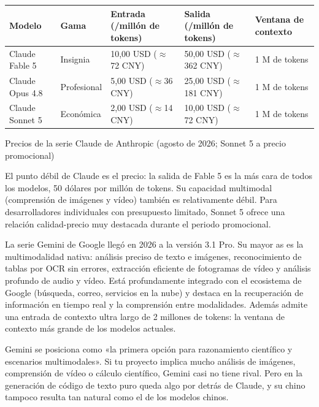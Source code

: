 \begin{center}
\begin{tabularx}{\linewidth}{|X|X|X|X|X|}
\hline
\textbf{Modelo} & \textbf{Gama} & \textbf{Entrada (/millón de tokens)} & \textbf{Salida (/millón de tokens)} & \textbf{Ventana de contexto} \tabularnewline
\hline
Claude Fable 5 & Insignia & 10,00 USD ($\approx$72 CNY) & 50,00 USD ($\approx$362 CNY) & 1 M de tokens \tabularnewline
Claude Opus 4.8 & Profesional & 5,00 USD ($\approx$36 CNY) & 25,00 USD ($\approx$181 CNY) & 1 M de tokens \tabularnewline
Claude Sonnet 5 & Económica & 2,00 USD ($\approx$14 CNY) & 10,00 USD ($\approx$72 CNY) & 1 M de tokens \tabularnewline
\hline
\end{tabularx}
\end{center}

\begin{center}\small\color{gray}Precios de la serie Claude de Anthropic (agosto de 2026; Sonnet 5 a precio promocional)\end{center}

El punto débil de Claude es el precio: la salida de Fable 5 es la más cara de todos los modelos, 50 dólares por millón de tokens. Su capacidad multimodal (comprensión de imágenes y vídeo) también es relativamente débil. Para desarrolladores individuales con presupuesto limitado, Sonnet 5 ofrece una relación calidad-precio muy destacada durante el periodo promocional.


La serie Gemini de Google llegó en 2026 a la versión 3.1 Pro. Su mayor as es la multimodalidad nativa: análisis preciso de texto e imágenes, reconocimiento de tablas por OCR sin errores, extracción eficiente de fotogramas de vídeo y análisis profundo de audio y vídeo. Está profundamente integrado con el ecosistema de Google (búsqueda, correo, servicios en la nube) y destaca en la recuperación de información en tiempo real y la comprensión entre modalidades. Además admite una entrada de contexto ultra largo de 2 millones de tokens: la ventana de contexto más grande de los modelos actuales.

Gemini se posiciona como «la primera opción para razonamiento científico y escenarios multimodales». Si tu proyecto implica mucho análisis de imágenes, comprensión de vídeo o cálculo científico, Gemini casi no tiene rival. Pero en la generación de código de texto puro queda algo por detrás de Claude, y su chino tampoco resulta tan natural como el de los modelos chinos.

